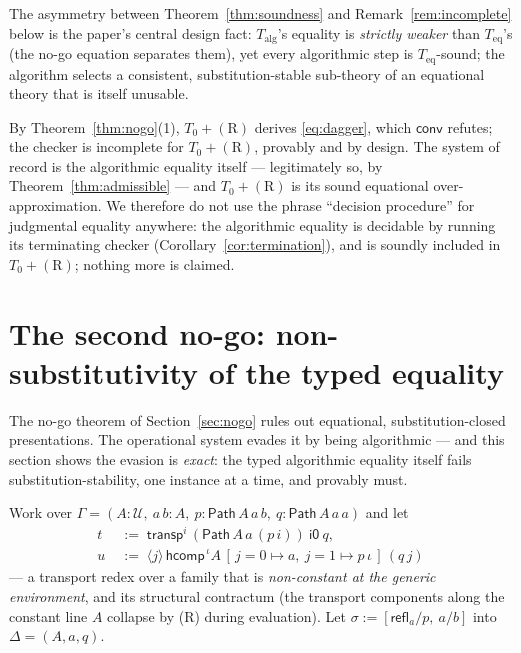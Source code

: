 \documentclass{lmcs}
\newcommand{\transp}{\mathsf{transp}}
\newcommand{\hcomp}{\mathsf{hcomp}}
\newcommand{\refl}{\mathsf{refl}}
\newcommand{\Path}{\mathsf{Path}}
\newcommand{\U}{\mathcal{U}}
\newcommand{\io}{\mathsf{i0}}
\newcommand{\convop}{\mathsf{conv}}
\begin{document}
\noindent The asymmetry between Theorem~\ref{thm:soundness} and
Remark~\ref{rem:incomplete} below is the paper's central design
fact: $T_{\mathrm{alg}}$'s equality is \emph{strictly weaker} than
$T_{\mathrm{eq}}$'s (the no-go equation separates them), yet every
algorithmic step is $T_{\mathrm{eq}}$-sound; the algorithm selects a
consistent, substitution-stable sub-theory of an equational theory
that is itself unusable.

\begin{rem}\label{rem:incomplete}
  By Theorem~\ref{thm:nogo}(1), $T_0+(\mathrm{R})$ derives
  \eqref{eq:dagger}, which $\convop$ refutes; the checker is
  incomplete for $T_0+(\mathrm{R})$, provably and by design.  The
  system of record is the algorithmic equality itself ---
  legitimately so, by Theorem~\ref{thm:admissible} ---
  and $T_0+(\mathrm{R})$ is its sound equational
  over-approximation.  We therefore do not use the phrase ``decision
  procedure'' for judgmental equality anywhere: the algorithmic
  equality is decidable by running its terminating checker
  (Corollary~\ref{cor:termination}), and is soundly included in
  $T_0+(\mathrm{R})$; nothing more is claimed.
\end{rem}

\section{The second no-go: non-substitutivity of the typed
  equality}
\label{sec:nonsubst}

The no-go theorem of Section~\ref{sec:nogo} rules out equational,
substitution-closed presentations.  The operational system evades it
by being algorithmic --- and this section shows the evasion is
\emph{exact}: the typed algorithmic equality itself fails
substitution-stability, one instance at a time, and provably must.

Work over $\Gamma = (A : \U,\ a\,b : A,\ p : \Path\,A\,a\,b,\
q : \Path\,A\,a\,a)$ and let
\begin{align*}
  t &\;:=\; \transp^i\,(\Path\,A\,a\,(p\,i))\ \io\ q,\\
  u &\;:=\; \langle j \rangle\, \hcomp^{\,\iota} A\,
    [\,j{=}0 \mapsto a,\ j{=}1 \mapsto p\,\iota\,]\,(q\,j)
\end{align*}
--- a transport redex over a family that is \emph{non-constant at the
generic environment}, and its structural contractum (the transport
components along the constant line $A$ collapse by (R) during
evaluation).  Let $\sigma := [\refl_a/p,\ a/b]$ into
$\Delta = (A, a, q)$.
\end{document}
